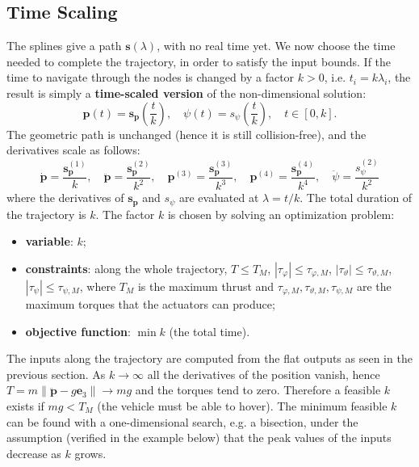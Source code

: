 \documentclass[10pt, a4paper]{report}
\begin{document}
\subsection{Time Scaling}
The splines give a path $\mathbf s(\lambda)$, with no real time yet. We now choose the time needed to complete the trajectory, in order to satisfy the input bounds. If the time to navigate through the nodes is changed by a factor $k>0$, i.e. $t_i=k\lambda_i$, the result is simply a \textbf{time-scaled version} of the non-dimensional solution:\begin{equation}
    \mathbf p(t)=\mathbf s_{\mathbf p}\left(\frac{t}{k}\right),\quad\psi(t)=s_\psi\left(\frac{t}{k}\right),\quad t\in[0,k].
\end{equation}
The geometric path is unchanged (hence it is still collision-free), and the derivatives scale as follows:\begin{equation}
    \dot{\mathbf p}=\frac{\mathbf s_{\mathbf p}^{(1)}}{k},\quad\ddot{\mathbf p}=\frac{\mathbf s_{\mathbf p}^{(2)}}{k^2},\quad\mathbf p^{(3)}=\frac{\mathbf s_{\mathbf p}^{(3)}}{k^3},\quad\mathbf p^{(4)}=\frac{\mathbf s_{\mathbf p}^{(4)}}{k^4},\quad\ddot\psi=\frac{s_\psi^{(2)}}{k^2}
\end{equation}
where the derivatives of $\mathbf s_{\mathbf p}$ and $s_\psi$ are evaluated at $\lambda=t/k$. The total duration of the trajectory is $k$. The factor $k$ is chosen by solving an optimization problem:\begin{itemize}
    \item \textbf{variable}: $k$;
    \item \textbf{constraints}: along the whole trajectory, $T\le T_M$, $|\tau_\varphi|\le\tau_{\varphi,M}$, $|\tau_\vartheta|\le\tau_{\vartheta,M}$, $|\tau_\psi|\le\tau_{\psi,M}$, where $T_M$ is the maximum thrust and $\tau_{\varphi,M},\tau_{\vartheta,M},\tau_{\psi,M}$ are the maximum torques that the actuators can produce;
    \item \textbf{objective function}: $\min k$ (the total time).
\end{itemize}
The inputs along the trajectory are computed from the flat outputs as seen in the previous section. As $k\to\infty$ all the derivatives of the position vanish, hence $T=m\|\ddot{\mathbf p}-g\mathbf e_3\|\to mg$ and the torques tend to zero. Therefore a feasible $k$ exists if $mg<T_M$ (the vehicle must be able to hover). The minimum feasible $k$ can be found with a one-dimensional search, e.g. a bisection, under the assumption (verified in the example below) that the peak values of the inputs decrease as $k$ grows.
\end{document}
